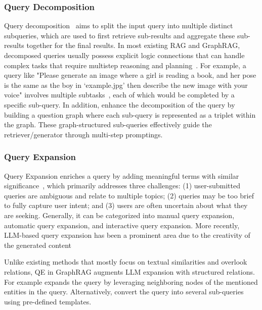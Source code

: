 \subsubsection{Query Decomposition}
Query decomposition~\cite{wong1976decomposition} aims to split the input query into multiple distinct subqueries, which are used to first retrieve sub-results and aggregate these sub-results together for the final results. In most existing RAG and GraphRAG, decomposed queries usually possess explicit logic connections that can handle complex tasks that require multistep reasoning and planning~\cite{lin2024graph, park2023graph, shen2023taskbench, song2023restgpt, xu2024p}. For example, a query like "Please generate an image where a girl is reading a book, and her pose is the same as the boy in `example.jpg' then describe the new image with your voice" involves multiple subtasks~\cite{xu2024p}, each of which would be completed by a specific sub-query. In addition, \citet{park2023graph} enhance the decomposition of the query by building a question graph where each sub-query is represented as a triplet within the graph. These graph-structured sub-queries effectively guide the retriever/generator through multi-step promptings.



\subsubsection{Query Expansion}
Query Expansion enriches a query by adding meaningful terms with similar significance~\cite{azad2019query}, which primarily addresses three challenges: (1) user-submitted queries are ambiguous and relate to multiple topics; (2) queries may be too brief to fully capture user intent; and (3) users are often uncertain about what they are seeking. Generally, it can be categorized into manual query expansion, automatic query expansion, and interactive query expansion. More recently, LLM-based query expansion has been a prominent area due to the creativity of the generated content\cite{chen2024analyze, jagerman2023query, lei2024corpus}

Unlike existing methods that mostly focus on textual similarities and overlook relations, QE in GraphRAG augments LLM expansion with structured relations. For example \citet{xia2024knowledge} expands the query by leveraging neighboring nodes of the mentioned entities in the query. Alternatively, \citet{keqing} convert the query into several sub-queries using pre-defined templates.



